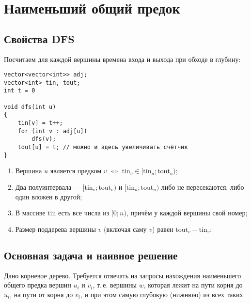 \section{Наименьший общий предок}

\subsection{Свойства DFS}

Посчитаем для каждой вершины времена входа и выхода при обходе в глубину:

\begin{verbatim}
vector<vector<int>> adj;
vector<int> tin, tout;
int t = 0

void dfs(int u)
{
    tin[v] = t++;
    for (int v : adj[u])
        dfs(v);
    tout[u] = t; // можно и здесь увеличивать счётчик
}
\end{verbatim}

\begin{theorem}
    \begin{enumerate}[nolistsep]
        \item Вершина $u$ является предком $v$ $\Longleftrightarrow$ $\mathrm{tin}_v \in [\mathrm{tin}_u; \mathrm{tout}_u)$;
        \item Два полуинтервала --- $[\mathrm{tin}_v; \mathrm{tout}_v)$ и $[\mathrm{tin}_u; \mathrm{tout}_u)$ либо не пересекаются, либо один вложен в другой;
        \item В массиве $\mathrm{tin}$ есть все числа из $[0; n)$, причём у каждой вершины свой номер;
        \item Размер поддерева вершины $v$ (включая саму $v$) равен $\mathrm{tout}_v - \mathrm{tin}_v$;
    \end{enumerate}
\end{theorem}

\subsection{Основная задача и наивное решение}

\begin{problem}
    Дано корневое дерево. Требуется отвечать на запросы нахождения наименьшего общего предка вершин $u_i$ и $v_i$, т.\,е. вершины $w$, которая лежит на пути корня до $u_i$, на пути от корня до $v_i$, и при этом самую глубокую (нижнюю) из всех таких.
\end{problem}

